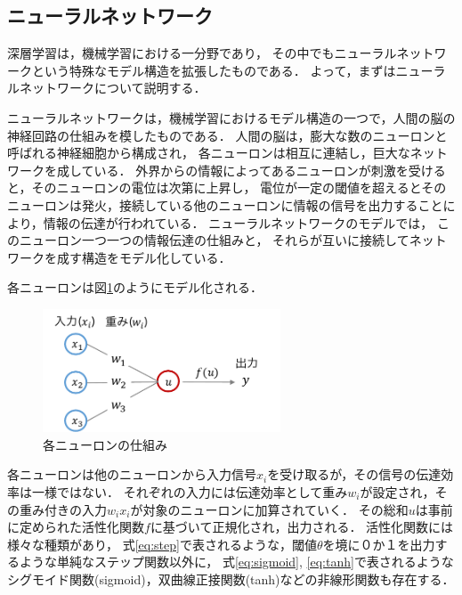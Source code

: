 \subsection{ニューラルネットワーク}
深層学習は，機械学習における一分野であり，
その中でもニューラルネットワークという特殊なモデル構造を拡張したものである．
よって，まずはニューラルネットワークについて説明する．

ニューラルネットワークは，機械学習におけるモデル構造の一つで，人間の脳の神経回路の仕組みを模したものである．
人間の脳は，膨大な数のニューロンと呼ばれる神経細胞から構成され，
各ニューロンは相互に連結し，巨大なネットワークを成している．
外界からの情報によってあるニューロンが刺激を受けると，そのニューロンの電位は次第に上昇し，
電位が一定の閾値を超えるとそのニューロンは発火，接続している他のニューロンに情報の信号を出力することにより，情報の伝達が行われている．
ニューラルネットワークのモデルでは，
このニューロン一つ一つの情報伝達の仕組みと，
それらが互いに接続してネットワークを成す構造をモデル化している．

各ニューロンは図\ref{fig:neuron}のようにモデル化される．

\begin{figure}[htb]
\begin{center}
\includegraphics[width=200pt]{./img/neuron.pdf}
\end{center}
\caption{各ニューロンの仕組み}
\label{fig:neuron}
\end{figure}

各ニューロンは他のニューロンから入力信号$x_i$を受け取るが，その信号の伝達効率は一様ではない．
それぞれの入力には伝達効率として重み$w_i$が設定され，その重み付きの入力$w_i x_i$が対象のニューロンに加算されていく．
その総和$u$は事前に定められた活性化関数$f$に基づいて正規化され，出力される．
活性化関数には様々な種類があり，
式\ref{eq:step}で表されるような，閾値$\theta$を境に０か１を出力するような単純なステップ関数以外に，
式\ref{eq:sigmoid}, \ref{eq:tanh}で表されるようなシグモイド関数(sigmoid)，双曲線正接関数(tanh)などの非線形関数も存在する．

